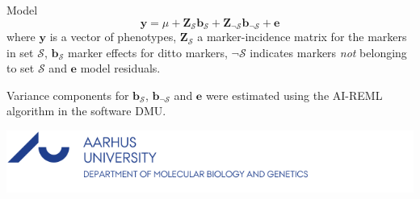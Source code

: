 \documentclass[landscape,a3paper,fontscale=0.75,margin=0.4cm]{baposter}
\begin{document}
\begin{poster}
\begin{posterbox}[name=model,column=1,below=genome]{Model}
   \begin{equation*}
     \mathbf{y} = \mu + \mathbf{Z}_\mathcal{S} \mathbf{b}_\mathcal{S} + \mathbf{Z}_{\neg\mathcal{S}} \mathbf{b}_{\neg\mathcal{S}} + \mathbf{e}
   \end{equation*}
    where $\mathbf{y}$ is a vector of phenotypes, $\mathbf{Z}_\mathcal{S}$ a marker-incidence matrix for the markers in set $\mathcal{S}$,
    $\mathbf{b}_\mathcal{S}$ marker effects for ditto markers, $\neg \mathcal{S}$ indicates markers \emph{not} belonging to set $\mathcal{S}$ 
    and $\mathbf{e}$ model residuals.
    
    \vspace{0.5em}
    Variance components for $\mathbf{b}_\mathcal{S}$, $\mathbf{b}_{\neg\mathcal{S}}$ and $\mathbf{e}$ were estimated using the AI-REML algorithm in the software DMU.
\end{posterbox}

\begin{posterbox}[name=aulogo,column=0,above=bottom,boxheaderheight=0em,boxshade=none]{}
  \includegraphics[scale=1]{au-mbg-en-au-blue}  %
\end{posterbox}

\end{poster}
\end{document}

